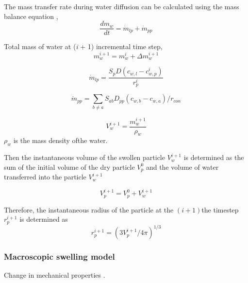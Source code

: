 \documentclass[preprint,12pt]{elsarticle}
\begin{document}
The mass transfer rate during water diffusion can be calculated using the mass
balance equation \cite{kimber2013formulation},
\begin{equation}
\label{eqn:mass-balance-equation-swelling}
\frac{d m_w}{d t} = \dot{m}_{lp} + \dot{m}_{pp}
\end{equation}


Total mass of water at (\textit{i} + 1) incremental time step,
\begin{equation}
\label{eqn:mass-increase}
m_w^{i+1} = m_w^{i} + \Delta m_w^{i+1}
\end{equation}


\begin{equation}
\label{eqn:mass-influx-lp}
\dot{m}_{lp} = \frac{S_p D (c_{w, l} - c^i_{w, p})}{r^i_p}
\end{equation}


\begin{equation}
\label{eqn:mass-influx-pp}
\dot{m}_{pp} = \sum_{b \neq a} S_{ab} D_{pp} (c_{w, b} - c_{w, a})/r_{con}
\end{equation}

\begin{equation}
\label{eqn:volume-of-water-in-particle}
{V}_{w}^{i+1} = \frac{m_w^{i + 1}}{\rho_w}
\end{equation}
$\rho_w$ is the mass density ofthe water.

Then the instantaneous volume of the swollen particle ${V}_{w}^{i+1}$ is
determined as the sum of the initial volume of the dry particle $V_p^0$ and
the volume of water transferred into the particle $V_w^{i+1}$

\begin{equation}
\label{eqn:volume-of-water-in-particle}
{V}_{p}^{i+1} = {V}_{p}^{0} + {V}_{w}^{i+1}
\end{equation}

Therefore, the instantaneous radius of the particle at the $(i + 1)$the
timestep  ${r}_{p}^{i+1}$ is determined as
\begin{equation}
\label{eqn:volume-of-water-in-particle}
{r}_{p}^{i+1} = (3 {V}_{p}^{i+1} / 4 \pi)^{1 / 3}
\end{equation}



\subsubsection*{Macroscopic swelling model}
Change in mechanical properties \cite{sweijen2017grain}.
\end{document}
